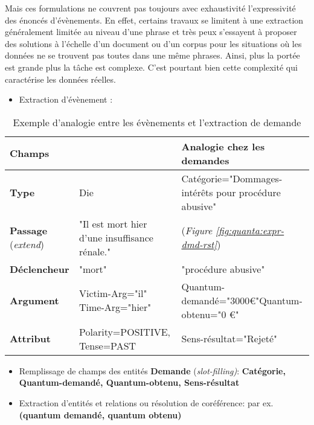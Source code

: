Mais ces formulations ne couvrent pas toujours avec exhaustivité l'expressivité des énoncés d'évènements. En effet, certains travaux se limitent à une extraction généralement limitée au niveau d'une phrase et très peux s'essayent à proposer des solutions à l'échelle d'un document ou d'un corpus pour les situations où les données ne se trouvent pas toutes dans une même phrases. Ainsi, plus la portée est grande plus la tâche est complexe. C'est pourtant bien cette complexité qui caractérise les données réelles. 
\begin{itemize}
\item Extraction d'évènement : 
\end{itemize}
\begin{table}[h]
\small
\begin{tabular}{|p{}|p{}|p{}|}
\hline
\textbf{Champs} & \textbf{\cite{ace2005event}} & \textbf{Analogie chez les demandes} \\ \hline
\textbf{Type} &  Die & Catégorie="Dommages-intérêts pour procédure abusive" \\ \hline
\textbf{Passage} (\textit{extend}) & "Il est mort hier d'une insuffisance rénale."  & (\textit{Figure \ref{fig:quanta:expr-dmd-rst}}) \\ \hline
\textbf{Déclencheur} & "mort" & "procédure abusive"\\ \hline
\textbf{Argument} & Victim-Arg="il" \linebreak Time-Arg="hier"  & Quantum-demandé="3000\euro{}"\linebreak  Quantum-obtenu="0 \euro{}"\ \\ \hline
\textbf{Attribut} & Polarity=POSITIVE, Tense=PAST & Sens-résultat="Rejeté" \\ \hline
\end{tabular}
\caption{Exemple d'analogie entre les évènements et l'extraction de demande} \label{tab:quanta:analogieevt}
\end{table}
\begin{itemize}
\item Remplissage de champs des entités \textbf{Demande} (\textit{slot-filling)}: \textbf{Catégorie, Quantum-demandé, Quantum-obtenu, Sens-résultat}
\item Extraction d'entités et relations ou résolution de coréférence: par ex. \textbf{(quantum demandé, quantum obtenu)}
\end{itemize}

